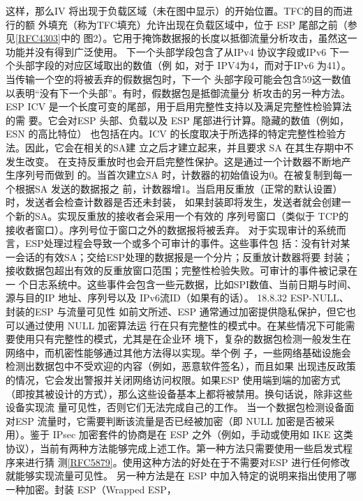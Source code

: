 这样，那么IV 将出现于负载区域（未在图中显示）的开始位置。TFC的目的而进行的额
外填充（称为TFC填充）允许出现在负载区域中，位于 ESP 尾部之前（参见\href{https://www.rfc-editor.org/rfc/rfc4303}{[RFC4303]}中的
图2）。它用于掩饰数据报的长度以抵御流量分析攻击，虽然这一功能并没有得到广泛使用。
下一个头部学段包含了从IPv4 协议字段或IPv6 下一个头部字段的对应区域取出的数值（例
如，对于 IPV4为4，而对于IPv6 为41）。当传输一个空的将被丢弃的假数据包时，下一个
头部字段可能会包含59这一数值以表明“没有下一个头部”。有时，假数据包是抵御流量分
析攻击的另一种方法。
ESP ICV 是一个长度可变的尾部，用于启用完整性支持以及满足完整性检验算法的需
要。它会对ESP 头部、负载以及 ESP 尾部进行计算。隐藏的数值（例如，ESN 的高比特位）
也包括在内。ICV 的长度取决于所选择的特定完整性检验方法。因此，它会在相关的SA建
立之后才建立起来，并且要求 SA 在其生存期中不发生改变。
在支持反重放时也会开启完整性保护。这是通过一个计数器不断地产生序列号而做到
的。当首次建立SA 时，计数器的初始值设为0。在被复制到每一个根据SA 发送的数据报之
前，计数器增1。当启用反重放（正常的默认设置）时，发送者会检查计数器是否还未封装，
如果封装即将发生，发送者就会创建一个新的SA。实现反重放的接收者会采用一个有效的
序列号窗口（类似于 TCP的接收者窗口）。序列号位于窗口之外的数据报将被丢弃。
对于实现审计的系统而言，ESP处理过程会导致一个或多个可审计的事件。这些事件包
括：没有针对某一会话的有效SA；交给ESP处理的数据报是一个分片；反重放计数器将要
封装；接收数据包超出有效的反重放窗口范围；完整性检验失败。可审计的事件被记录在一
个日志系统中。这些事件会包含一些元数据，比如SPI数值、当前日期与时间、源与目的IP
地址、序列号以及 IPv6流ID（如果有的话）。
18.8.32
ESP-NULL、封装的ESP 与流量可见性
如前文所述、ESP 通常通过加密提供隐私保护，但它也可以通过使用 NULL 加密算法运
行在只有完整性的模式中。在某些情况下可能需要使用只有完整性的模式，尤其是在企业环
境下，复杂的数据包检测一般发生在网络中，而机密性能够通过其他方法得以实现。举个例
子，一些网络基础设施会检测出数据包中不受欢迎的内容（例如，恶意软件签名），而且如果
出现违反政策的情况，它会发出警报并关闭网络访问权限。如果ESP 使用端到端的加密方式
（即按其被设计的方式），那么这些设备基本上都将被禁用。换句话说，除非这些设备实现流
量可见性，否则它们无法完成自己的工作。
当一个数据包检测设备面对ESP 流量时，它需要判断该流量是否已经被加密（即 NULL
加密是否被采用）。鉴于 IPsec 加密套件的协商是在 ESP 之外（例如，手动或使用如 IKE 这类
协议），当前有两种方法能够完成上述工作。第一种方法只需要使用一些启发式程序来进行猜
测\href{https://www.rfc-editor.org/rfc/rfc5879}{[RFC5879]}。使用这种方法的好处在于不需要对ESP 进行任何修改就能够实现流量可见性。
另一种方法是在 ESP 中加入特定的说明来指出使用了哪一种加密。封装 ESP（Wrapped ESP，
